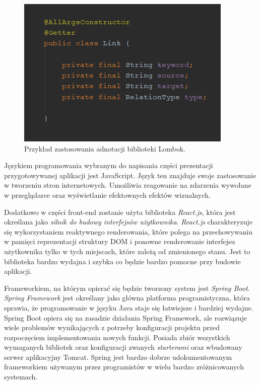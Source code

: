 \begin{figure}[h] %
	\centering
	\includegraphics[width=0.6\linewidth]{img/tools_lombok_1}
	\caption{Przykład zastosowania adnotacji biblioteki Lombok.}
\end{figure}

Językiem programowania wybranym do napisania części prezentacji przygotowywanej aplikacji jest JavaScript. Język ten znajduje swoje zastosowanie w tworzeniu stron internetowych. Umożliwia reagowanie na zdarzenia wywołane w przeglądarce oraz wyświetlanie efektownych efektów wizualnych. 

Dodatkowo w części front-end zostanie użyta biblioteka \textit{React.js}, która jest określana jako \textit{silnik do budowy interfejsów użytkownika}. \textit{React.js} charakteryzuje się wykorzystaniem reaktywnego renderowania, które polega na przechowywaniu w pamięci reprezentacji struktury DOM i ponowne renderowanie interfejsu użytkownika tylko w tych miejscach, które zależą od zmienionego stanu. Jest to biblioteka bardzo wydajna i szybka co będzie bardzo pomocne przy budowie aplikacji.

Frameworkiem, na którym opierać się będzie tworzony system jest \textit{Spring Boot}. \textit{Spring Framework} jest określany jako główna platforma programistyczna, która sprawia, że programowanie w języku Java staje się łatwiejsze i bardziej wydajne. Spring Boot opiera się na zasadzie działania Spring Framework, ale rozwiązuje wiele problemów wynikających z potrzeby konfiguracji projektu przed rozpoczęciem implementowania nowych funkcji. Posiada zbiór wszystkich wymaganych bibliotek oraz konfiguracji zwanych \textit{starterami} oraz wbudowany serwer aplikacyjny Tomcat. Spring jest bardzo dobrze udokumentowanym frameworkiem używanym przez programistów w wielu bardzo zróżnicowanych systemach.

